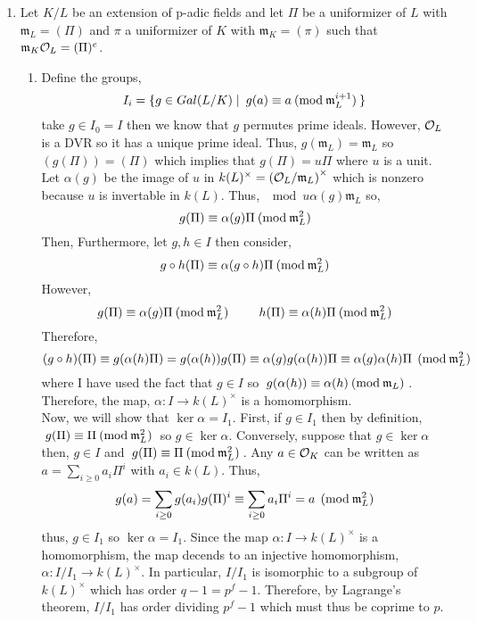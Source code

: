\documentclass[12pt]{extarticle}
\begin{document}
\begin{enumerate}
\item Let $K / L$ be an extension of p-adic fields and let $\Pi$ be a uniformizer of $L$ with $\mathfrak{m}_L = (\Pi)$ and $\pi$ a uniformizer of $K$ with $\mathfrak{m}_K = (\pi)$ such that $\mathfrak{m}_K \mathcal{O}_{L} = (\Pi)^e $.
\begin{enumerate}
\item 
Define the groups,
\[ I_i = \{ g \in Gal \small(L/K \small) \mid \: g(a) \equiv a \: (\mathrm{mod} \: \mathfrak{m}_L^{i + 1}) \: \} \]
take $g \in I_0 = I$ then we know that $g$ permutes prime ideals. However, $\mathcal{O}_{L}$ is a DVR so it has a unique prime ideal. Thus, $g(\mathfrak{m}_L) = \mathfrak{m}_L$ so $(g(\Pi)) = (\Pi)$ which implies that $g(\Pi) = u \Pi$ where $u$ is a unit. Let $\alpha(g)$ be the image of $u$ in $k(L)^\times = \left(\mathcal{O}_{L}/\mathfrak{m}_L\right)^\times$ which is nonzero because $u$ is invertable in $k(L)$. Thus, $\mod{u}{\alpha(g)}{\mathfrak{m}_L}$ so,
\[\: g(\Pi) \equiv \alpha(g) \Pi \: (\mathrm{mod} \: \mathfrak{m}_{L}^2) \: \]
Then, Furthermore, let $g, h \in I$ then consider,
\[ \: g \circ h(\Pi) \equiv \alpha(g \circ h) \Pi \: (\mathrm{mod} \: \mathfrak{m}_{L}^2) \: \]
However,
\[ \: g(\Pi) \equiv \alpha(g) \Pi \: (\mathrm{mod} \: \mathfrak{m}_{L}^2) \: \quad \quad \: h(\Pi) \equiv \alpha(h) \Pi \: (\mathrm{mod} \: \mathfrak{m}_{L}^2) \:\]
Therefore,
\[ (g \circ h)(\Pi) \equiv g( \alpha(h) \Pi) = g(\alpha(h)) g(\Pi) \equiv \alpha(g) g(\alpha(h)) \Pi \equiv \alpha(g) \alpha(h) \Pi \: \: (\mathrm{mod} \: \mathfrak{m}_{L}^2) \]
where I have used the fact that $g \in I$ so $\: g(\alpha(h)) \equiv \alpha(h) \: (\mathrm{mod} \: \mathfrak{m}_{L}) \:$. Therefore, the map, $\alpha : I \to k(L)^\times$ is a homomorphism. \bigskip \\
Now, we will show that $\ker{\alpha} = I_1$. First, if $g \in I_1$ then by definition, $\: g(\Pi) \equiv \Pi \: (\mathrm{mod} \: \mathfrak{m}_{L}^2) \:$ so $g \in \ker{\alpha}$. Conversely, suppose that $g \in \ker{\alpha}$ then, $g \in I$ and $\: g(\Pi) \equiv \Pi \: (\mathrm{mod} \: \mathfrak{m}_{L}^2) \:$. Any $a \in \mathcal{O}_{K}$ can be written as $a = \sum\limits_{i \ge 0} a_i \Pi^i$ with $a_i \in k(L)$. Thus,
\[ g(a) = \sum\limits_{i \ge 0} g(a_i) g(\Pi)^i \equiv \sum\limits_{i \ge 0} a_i \Pi^i = a \: \: (\mathrm{mod} \: \mathfrak{m}_{L}^2) \]
thus, $g \in I_1$ so $\ker{\alpha} = I_1$. Since the map $\alpha : I \to k(L)^\times$ is a homomorphism, the map decends to an injective homomorphism, $\alpha : I/I_1 \to k(L)^\times$. In particular, $I/I_1$ is isomorphic to a subgroup of $k(L)^\times$ which has order $q - 1 = p^f - 1$. Therefore, by Lagrange's theorem, $I/I_1$ has order dividing $p^f - 1$ which must thus be coprime to $p$.
   

\end{enumerate}
\end{enumerate}
\end{document}
